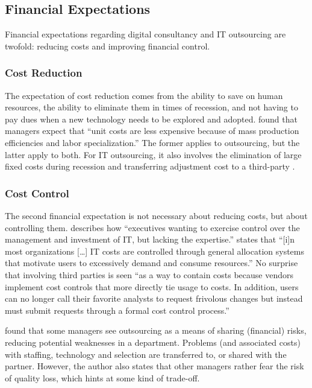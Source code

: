 \documentclass[12pt]{article}
\begin{document}
\subsection{Financial Expectations}\label{financial-expectations}

Financial expectations regarding digital consultancy and IT outsourcing
are twofold: reducing costs and improving financial control.

\subsubsection{Cost Reduction}\label{cost-reduction}

The expectation of cost reduction comes from the ability to save on
human resources, the ability to eliminate them in times of recession,
and not having to pay dues when a new technology needs to be explored
and adopted. \citet[10]{lacity1994} found that managers expect that
``unit costs are less expensive because of mass production efficiencies
and labor specialization.'' The former applies to outsourcing, but the
latter apply to both. For IT outsourcing, it also involves the
elimination of large fixed costs during recession and transferring
adjustment cost to a third-party \citep[ 52]{aubert1996}.

\subsubsection{Cost Control}\label{cost-control}

The second financial expectation is not necessary about reducing costs,
but about controlling them. \citet[233]{sturdy1998} describes how
``executives wanting to exercise control over the management and
investment of IT, but lacking the expertise.'' \citet[10]{lacity1994}
states that ``{[}i{]}n most organizations {[}\ldots{]} IT costs are
controlled through general allocation systems that motivate users to
excessively demand and consume resources.'' No surprise that involving
third parties is seen ``as a way to contain costs because vendors
implement cost controls that more directly tie usage to costs. In
addition, users can no longer call their favorite analysts to request
frivolous changes but instead must submit requests through a formal cost
control process.''

\citet[454]{ketler1993} found that some managers see outsourcing as a
means of sharing (financial) risks, reducing potential weaknesses in a
department. Problems (and associated costs) with staffing, technology
and selection are transferred to, or shared with the partner. However,
the author also states that other managers rather fear the risk of
quality loss, which hints at some kind of trade-off.
\end{document}
